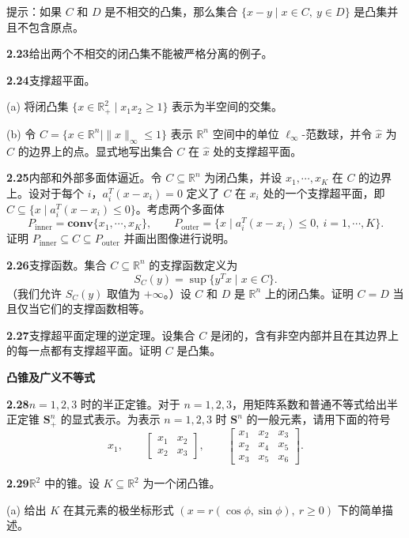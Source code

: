 \documentclass[UTF8,12pt,a4paper,fontset=fandol]{ctexart}
\begin{document}
提示：如果 $C$ 和 $D$ 是不相交的凸集，那么集合 $\{x-y\mid x\in C,\ y\in D\}$ 是凸集并且不包含原点。

\noindent\textbf{2.23}\quad 给出两个不相交的闭凸集不能被严格分离的例子。

\noindent\textbf{2.24}\quad 支撑超平面。

\noindent(a) 将闭凸集 $\{x\in\mathbb{R}_+^2\mid x_1x_2\ge1\}$ 表示为半空间的交集。

\noindent(b) 令 $C=\{x\in\mathbb{R}^n\mid \|x\|_\infty\le1\}$ 表示 $\mathbb{R}^n$ 空间中的单位 $\ell_\infty$-范数球，并令 $\hat{x}$ 为 $C$ 的边界上的点。显式地写出集合 $C$ 在 $\hat{x}$ 处的支撑超平面。

\noindent\textbf{2.25}\quad 内部和外部多面体逼近。令 $C\subseteq\mathbb{R}^n$ 为闭凸集，并设 $x_1,\cdots,x_K$ 在 $C$ 的边界上。设对于每个 $i$，$a_i^T(x-x_i)=0$ 定义了 $C$ 在 $x_i$ 处的一个支撑超平面，即 $C\subseteq\{x\mid a_i^T(x-x_i)\le0\}$。考虑两个多面体
\[
  P_{\mathrm{inner}}=\mathbf{conv}\{x_1,\cdots,x_K\},\qquad
  P_{\mathrm{outer}}=\{x\mid a_i^T(x-x_i)\le0,\ i=1,\cdots,K\}.
\]
证明 $P_{\mathrm{inner}}\subseteq C\subseteq P_{\mathrm{outer}}$ 并画出图像进行说明。

\noindent\textbf{2.26}\quad 支撑函数。集合 $C\subseteq\mathbb{R}^n$ 的支撑函数定义为
\[
  S_C(y)=\sup\{y^Tx\mid x\in C\}.
\]
（我们允许 $S_C(y)$ 取值为 $+\infty$。）设 $C$ 和 $D$ 是 $\mathbb{R}^n$ 上的闭凸集。证明 $C=D$ 当且仅当它们的支撑函数相等。

\noindent\textbf{2.27}\quad 支撑超平面定理的逆定理。设集合 $C$ 是闭的，含有非空内部并且在其边界上的每一点都有支撑超平面。证明 $C$ 是凸集。

\noindent\textbf{凸锥及广义不等式}

\noindent\textbf{2.28}\quad $n=1,2,3$ 时的半正定锥。对于 $n=1,2,3$，用矩阵系数和普通不等式给出半正定锥 $\mathbf{S}_+^n$ 的显式表示。为表示 $n=1,2,3$ 时 $\mathbf{S}^n$ 的一般元素，请用下面的符号
\[
  x_1,\qquad
  \begin{bmatrix} x_1 & x_2\\ x_2 & x_3 \end{bmatrix},\qquad
  \begin{bmatrix} x_1 & x_2 & x_3\\ x_2 & x_4 & x_5\\ x_3 & x_5 & x_6 \end{bmatrix}.
\]

\noindent\textbf{2.29}\quad $\mathbb{R}^2$ 中的锥。设 $K\subseteq\mathbb{R}^2$ 为一个闭凸锥。

\noindent(a) 给出 $K$ 在其元素的极坐标形式 $(x=r(\cos\phi,\sin\phi),\ r\ge0)$ 下的简单描述。
\end{document}
